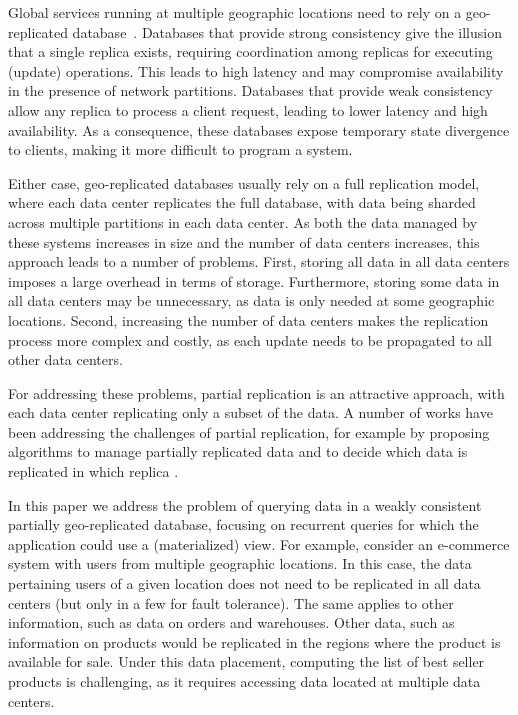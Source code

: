 \documentclass[sigconf, nonacm]{acmart}
\begin{document}

Global services running at multiple geographic locations need 
to rely on a geo-replicated database~\cite{dynamo}.
Databases \cite{spanner,cockroachdb,mdcc} that provide strong consistency give the illusion that 
a single replica exists, requiring coordination among
replicas for executing (update) operations. This leads to high latency and may compromise 
availability in the presence of network partitions.
Databases that provide weak consistency \cite{eventual,dynamo,cops} allow any replica to process a
client request, leading to lower latency and high availability. As a consequence, these databases expose
temporary state divergence to clients, making it more difficult to program a system. 

Either case, geo-replicated databases usually rely on a full replication model, where each data 
center replicates the full database, with data being sharded across multiple partitions in each data 
center. 
As both the data managed by these systems increases in size and the number of data centers increases,
this approach leads to a number of problems.
First, storing all data in all data centers imposes a large overhead in terms of storage. 
Furthermore, storing some data in all data centers may be unnecessary, as data is only needed at some
geographic locations.
Second, increasing the number of data centers makes the replication process more complex and costly, 
as each update needs to be propagated to all other data centers.

For addressing these problems, partial replication is an attractive approach, with each data center
replicating only a subset of the data.
A number of works have been addressing the challenges of 
partial replication, for example by proposing algorithms to manage partially replicated data \cite{spanner,saturn,sipre, practi} and to decide which data is replicated in which replica \cite{slog, sipre}.

In this paper we address the problem of querying data in a weakly consistent partially geo-replicated database, 
focusing on recurrent queries for which the application could use a (materialized) view.
For example, consider an e-commerce system with users from multiple geographic locations.
In this case, the data pertaining users of a given location does not need to be replicated in all data centers
(but only in a few for fault tolerance). The same applies to other information, such as data on orders and 
warehouses.
Other data, such as information on products would be replicated in the regions where the product
is available for sale.  
Under this data placement, computing the list of best seller products is challenging, as it requires
accessing data located at multiple data centers.
\end{document}
